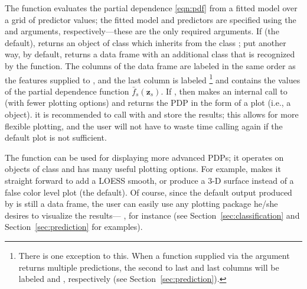 The  function evaluates the partial dependence \eqref{eqn:pdf} from a fitted model over a grid of predictor values; the fitted model and predictors are specified using the  and  arguments, respectively---these are the only required arguments. If  (the default),  returns an object of class  which inherits from the class ; put another way, by default,  returns a data frame with an additional class that is recognized by the  function. The columns of the data frame are labeled in the same order as the features supplied to , and the last column is labeled \footnote{There is one exception to this. When a function supplied via the  argument returns multiple predictions, the second to last and last columns will be labeled  and , respectively (see Section~\ref{sec:prediction}).} and contains the values of the partial dependence function $\bar{f}_s\left(\boldsymbol{z}_s\right)$. If , then  makes an internal call to  (with fewer plotting options) and returns the PDP in the form of a  plot (i.e., a  object).   it is recommended to call  with  and store the results; this allows for more flexible plotting, and the user will not have to waste time calling  again if the default plot is not sufficient.

The  function can be used for displaying more advanced PDPs; it operates on objects of class  and has many useful plotting options. For example,  makes it straight forward to add a LOESS smooth, or produce a 3-D surface instead of a false color level plot (the default). Of course, since the default output produced by  is still a data frame, the user can easily use any plotting package he/she desires to visualize the results--- \citep{ggplot2-pkg}, for instance (see Section~\ref{sec:classification} and Section~\ref{sec:prediction} for examples).

